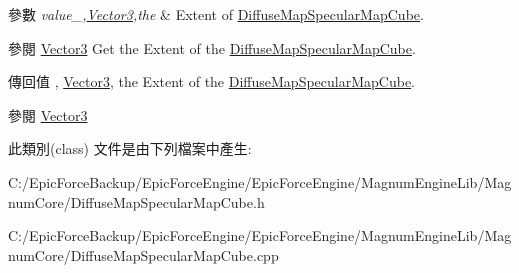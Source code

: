 \begin{DoxyParams}{參數}
{\em value\+\_\+,\hyperlink{class_magnum_1_1_vector3}{Vector3},the} & Extent of \hyperlink{class_magnum_1_1_diffuse_map_specular_map_cube}{Diffuse\+Map\+Specular\+Map\+Cube}. \\
\hline
\end{DoxyParams}
\begin{DoxySeeAlso}{參閱}
\hyperlink{class_magnum_1_1_vector3}{Vector3} Get the Extent of the \hyperlink{class_magnum_1_1_diffuse_map_specular_map_cube}{Diffuse\+Map\+Specular\+Map\+Cube}. 
\end{DoxySeeAlso}
\begin{DoxyReturn}{傳回值}
, \hyperlink{class_magnum_1_1_vector3}{Vector3}, the Extent of the \hyperlink{class_magnum_1_1_diffuse_map_specular_map_cube}{Diffuse\+Map\+Specular\+Map\+Cube}. 
\end{DoxyReturn}
\begin{DoxySeeAlso}{參閱}
\hyperlink{class_magnum_1_1_vector3}{Vector3} 
\end{DoxySeeAlso}


此類別(class) 文件是由下列檔案中產生\+:\begin{DoxyCompactItemize}
\item 
C\+:/\+Epic\+Force\+Backup/\+Epic\+Force\+Engine/\+Epic\+Force\+Engine/\+Magnum\+Engine\+Lib/\+Magnum\+Core/Diffuse\+Map\+Specular\+Map\+Cube.\+h\item 
C\+:/\+Epic\+Force\+Backup/\+Epic\+Force\+Engine/\+Epic\+Force\+Engine/\+Magnum\+Engine\+Lib/\+Magnum\+Core/Diffuse\+Map\+Specular\+Map\+Cube.\+cpp\end{DoxyCompactItemize}
